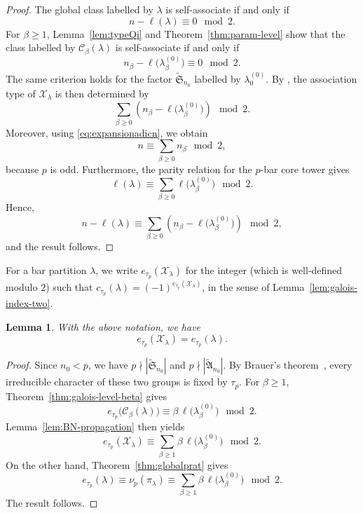 \documentclass[reqno]{amsart}
\newcommand{\sym}{\mathfrak{S}}
\newcommand{\alt}{\mathfrak{A}}
\newtheorem{lemma}[theorem]{Lemma}     %
\theoremstyle{definition}
\begin{document}
\begin{proof}
The global class labelled by $\lambda$ is self-associate if and only if
\[
n-\ell(\lambda)\equiv0\mod2.
\]
For $\beta\geq1$, Lemma~\ref{lem:typeQi} and
Theorem~\ref{thm:param-level} show that the class labelled by
$\mathcal C_\beta(\lambda)$ is self-associate if and only if
\[
n_\beta-\ell\bigl(\lambda_\beta^{(0)}\bigr)
\equiv0\mod2.
\]
The same criterion holds for the factor
$\widetilde{\sym}_{n_0}$ labelled by $\lambda_0^{(0)}$.
By \cite[Proposition 1.2]{MichlerOlsson}, %
the association type of
$\mathcal X_\lambda$ is then determined by
\[
\sum_{\beta\geq0}
\left(
n_\beta-\ell\bigl(\lambda_\beta^{(0)}\bigr)
\right)
\mod2.
\]
Moreover, using \eqref{eq:expansionadicn}, we obtain
\[
n\equiv\sum_{\beta\geq0}n_\beta\mod2,
\]
because $p$ is odd. Furthermore, the parity relation for the $p$-bar core
tower gives
\[
\ell(\lambda)
\equiv
\sum_{\beta\geq0}
\ell\bigl(\lambda_\beta^{(0)}\bigr)
\mod2.
\]
Hence,
\[
n-\ell(\lambda)
\equiv
\sum_{\beta\geq0}
\left(
n_\beta-\ell\bigl(\lambda_\beta^{(0)}\bigr)
\right)
\mod2,
\]
and the result follows.
\end{proof}
\noindent
For a bar partition $\lambda$, we write $ e_{\tau_p}(\mathcal X_\lambda) $
for the integer (which is well-defined modulo $2$) such that
$c_{\tau_p}(\lambda)=(-1)^{e_{\tau_p}(\mathcal X_\lambda)}$, in the sense
of Lemma~\ref{lem:galois-index-two}.
\begin{lemma}
\label{lem:global-local-galois}
With the above notation, we have
\[
e_{\tau_p}(\mathcal X_\lambda)
=
e_{\tau_p}(\lambda).
\]
\end{lemma}

\begin{proof}
Since $n_0<p$, we have $ p\nmid |\widetilde{\sym}_{n_0}|$ and $ p\nmid
|\widetilde{\alt}_{n_0}|$. By Brauer's theorem~\cite[Theorem
(10.3)]{isaacs}, every irreducible character of these two groups is fixed
by $\tau_p$.
For $\beta\geq1$, Theorem~\ref{thm:galois-level-beta} gives
\[
e_{\tau_p}\bigl(\mathcal C_\beta(\lambda)\bigr)
\equiv
\beta\,\ell\bigl(\lambda_\beta^{(0)}\bigr)
\mod2.
\]
Lemma~\ref{lem:BN-propagation} then yields
\[
e_{\tau_p}(\mathcal X_\lambda)
\equiv
\sum_{\beta\geq1}
\beta\,\ell\bigl(\lambda_\beta^{(0)}\bigr)
\mod2.
\]
On the other hand, Theorem~\ref{thm:globalprat} gives
\[
e_{\tau_p}(\lambda)
\equiv
\nu_p(\pi_\lambda)
\equiv
\sum_{\beta\geq1}
\beta\,\ell\bigl(\lambda_\beta^{(0)}\bigr)
\mod2.
\]
The result follows.
\end{proof}
\end{document}
